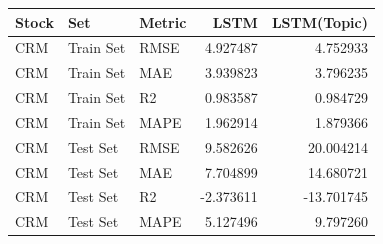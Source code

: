 \begin{tabular}{lllrr}
\toprule
Stock & Set & Metric & LSTM & LSTM(Topic) \\
\midrule
CRM & Train Set & RMSE & 4.927487 & 4.752933 \\
CRM & Train Set & MAE & 3.939823 & 3.796235 \\
CRM & Train Set & R2 & 0.983587 & 0.984729 \\
CRM & Train Set & MAPE & 1.962914 & 1.879366 \\
CRM & Test Set & RMSE & 9.582626 & 20.004214 \\
CRM & Test Set & MAE & 7.704899 & 14.680721 \\
CRM & Test Set & R2 & -2.373611 & -13.701745 \\
CRM & Test Set & MAPE & 5.127496 & 9.797260 \\
\bottomrule
\end{tabular}
